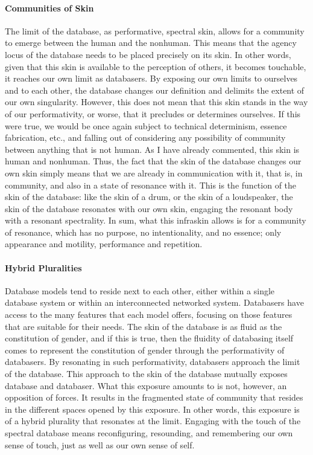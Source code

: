 \paragraph{Communities of Skin}
The limit of the database, as performative, spectral skin, allows for a community to emerge between the human and the nonhuman. This means that the agency locus of the database needs to be placed precisely on its skin. In other words, given that this skin is available to the perception of others, it becomes touchable, it reaches our own limit as databasers. By exposing our own limits to ourselves and to each other, the database changes our definition and delimits the extent of our own singularity. However, this does not mean that this skin stands in the way of our performativity, or worse, that it precludes or determines ourselves. If this were true, we would be once again subject to technical determinism, essence fabrication, etc., and falling out of considering any possibility of community between anything that is not human. As I have already commented, this skin is human and nonhuman. Thus, the fact that the skin of the database changes our own skin simply means that we are already in communication with it, that is, in community, and also in a state of resonance with it. This is the function of the skin of the database: like the skin of a drum, or the skin of a loudspeaker, the skin of the database resonates with our own skin, engaging the resonant body with a resonant spectrality. In sum, what this infraskin allows is for a community of resonance, which has no purpose, no intentionality, and no essence; only appearance and motility, performance and repetition.

\paragraph{Hybrid Pluralities}
Database models tend to reside next to each other, either within a single database system or within an interconnected networked system. Databasers have access to the many features that each model offers, focusing on those features that are suitable for their needs. The skin of the database is as fluid as the constitution of gender, and if this is true, then the fluidity of databasing itself comes to represent the constitution of gender through the performativity of databasers. By resonating in such performativity, databasers approach the limit of the database. This approach to the skin of the database mutually exposes database and databaser. What this exposure amounts to is not, however, an opposition of forces. It results in the fragmented state of community that resides in the different spaces opened by this exposure. In other words, this exposure is of a hybrid plurality that resonates at the limit. Engaging with the touch of the spectral database means reconfiguring, resounding, and remembering our own sense of touch, just as well as our own sense of self.

